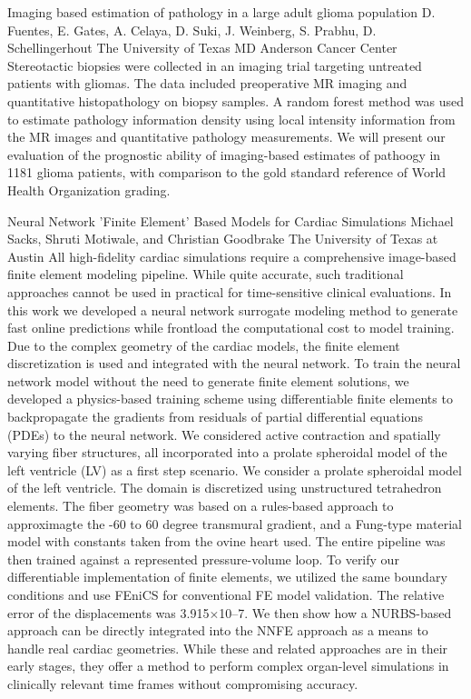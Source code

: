 \begin{addmargin}[2em]{0em}
\vspace{1.5ex}
\abs
{Imaging based estimation of pathology in a large adult glioma population}
{D. Fuentes, E. Gates, A. Celaya, D. Suki, J. Weinberg, S. Prabhu, D. Schellingerhout}
{The University of Texas MD Anderson Cancer Center}
{Stereotactic biopsies were collected in an imaging trial targeting untreated patients with gliomas. The data included preoperative MR imaging and quantitative histopathology on biopsy samples. A random forest method was used to estimate pathology information density using local intensity information from the MR images and quantitative pathology measurements.  We will present our evaluation of the prognostic ability of imaging-based estimates of pathoogy in 1181 glioma patients, with comparison to the gold standard reference of World Health Organization grading.}


\vspace{1.5ex}
\abs
{Neural Network ’Finite Element’ Based Models for Cardiac Simulations}
{Michael Sacks, Shruti Motiwale, and Christian Goodbrake}
{The University of Texas at Austin}
{All high-fidelity cardiac simulations require a comprehensive image-based finite element modeling pipeline. While quite accurate, such traditional approaches cannot be used in practical for time-sensitive clinical evaluations. In this work we developed a neural network surrogate modeling method to generate fast online predictions while frontload the computational cost to model training. Due to the complex geometry of the cardiac models, the finite element discretization is used and integrated with the neural network. To train the neural network model without the need to generate finite element solutions, we developed a physics-based training scheme using differentiable finite elements to backpropagate the gradients from residuals of partial differential equations (PDEs) to the neural network. We considered active contraction and spatially varying fiber structures, all incorporated into a prolate spheroidal model of the left ventricle (LV) as a first step scenario. We consider a prolate spheroidal model of the left ventricle. The domain is discretized using unstructured tetrahedron elements. The fiber geometry was based on a rules-based approach to approximagte the -60 to 60 degree transmural gradient, and a Fung-type material model with constants taken from the ovine heart used.  The entire pipeline was then trained against a represented pressure-volume loop. To verify our differentiable implementation of finite elements, we utilized the same boundary conditions and use FEniCS for conventional FE model validation. The relative error of the displacements was 3.915$\times$10–7. We then show how a NURBS-based approach can be directly integrated into the NNFE approach as a means to handle real cardiac geometries.  While these and related approaches are in their early stages, they offer a method to perform complex organ-level simulations in clinically relevant time frames without compromising accuracy.}

\end{addmargin}
